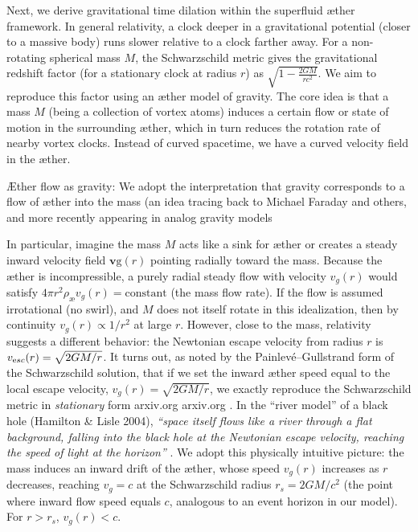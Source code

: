 \documentclass[aps,preprint,superscriptaddress]{revtex4}
\begin{document}
Next, we derive gravitational time dilation within the superfluid æther framework. In general relativity, a clock deeper in a gravitational potential (closer to a massive body) runs slower relative to a clock farther away. For a non-rotating spherical mass $M$, the Schwarzschild metric gives the gravitational redshift factor (for a stationary clock at radius $r$) as $\sqrt{1-\frac{2GM}{r c^2}}$. We aim to reproduce this factor using an æther model of gravity. The core idea is that a mass $M$ (being a collection of vortex atoms) induces a certain flow or state of motion in the surrounding æther, which in turn reduces the rotation rate of nearby vortex clocks. Instead of curved spacetime, we have a curved velocity field in the æther.


Æther flow as gravity: We adopt the interpretation that gravity corresponds to a flow of æther into the mass (an idea tracing back to Michael Faraday and others, and more recently appearing in analog gravity models


In particular, imagine the mass $M$ acts like a sink for æther or creates a steady inward velocity field $\mathbf{v}\text{g}(r)$ pointing radially toward the mass. Because the æther is incompressible, a purely radial steady flow with velocity $v_g(r)$ would satisfy $4\pi r^2 \rho_{\text{\ae}} v_g(r) = \text{constant}$ (the mass flow rate). If the flow is assumed irrotational (no swirl), and $M$ does not itself rotate in this idealization, then by continuity $v_g(r) \propto 1/r^2$ at large $r$. However, close to the mass, relativity suggests a different behavior: the Newtonian escape velocity from radius $r$ is $v_{\textrm esc}(r) = \sqrt{2GM/r}$. It turns out, as noted by the Painlevé–Gullstrand form of the Schwarzschild solution, that if we set the inward æther speed equal to the local escape velocity, $v_g(r)=\sqrt{2GM/r}$, we exactly reproduce the Schwarzschild metric in \textit{stationary} form arxiv.org
 arxiv.org
. In the “river model” of a black hole (Hamilton & Lisle 2004), \textit{“space itself flows like a river through a flat background, falling into the black hole at the Newtonian escape velocity, reaching the speed of light at the horizon”}
. We adopt this physically intuitive picture: the mass induces an inward drift of the æther, whose speed $v_g(r)$ increases as $r$ decreases, reaching $v_g = c$ at the Schwarzschild radius $r_s = 2GM/c^2$ (the point where inward flow speed equals $c$, analogous to an event horizon in our model). For $r > r_s$, $v_g(r) < c$.
\end{document}

